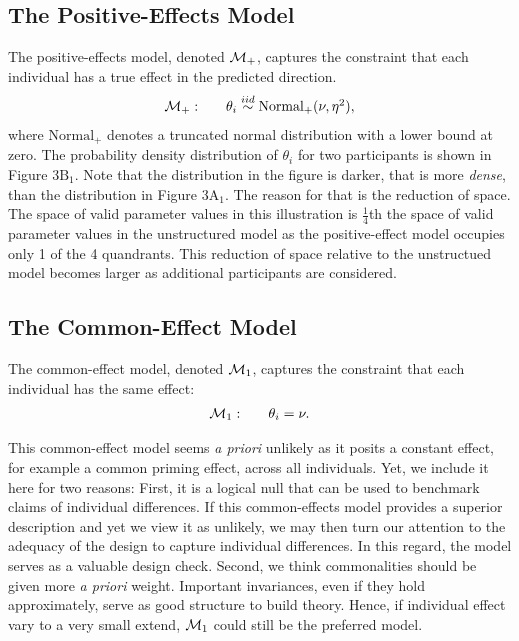 \documentclass[american,man]{apa6}
\begin{document}
\subsection{The Positive-Effects
Model}\label{the-positive-effects-model}

The positive-effects model, denoted \({\cal M}_+\), captures the constraint
that each individual has a true effect in the predicted direction. \[
  \begin{array}{llr}
{\cal M}_+: & & \theta_i \stackrel{iid}{\sim} \mbox{Normal}_+(\nu,\eta^2),\\
  \end{array}
\] where \(\mbox{Normal}_+\) denotes a truncated normal distribution
with a lower bound at zero. The probability density distribution of
\(\theta_i\) for two participants is shown in Figure 3\(\mbox{B}_1\).
Note that the distribution in the figure is darker, that is more
\emph{dense}, than the distribution in Figure 3\(\mbox{A}_1\). The
reason for that is the reduction of space. The space of valid parameter
values in this illustration is \(\frac{1}{4}\)th the space of valid
parameter values in the unstructured model as the positive-effect model
occupies only 1 of the 4 quandrants. This reduction of space relative to
the unstructued model becomes larger as additional participants are
considered.

\subsection{The Common-Effect Model}\label{the-common-effect-model}

The common-effect model, denoted \({\cal M}_1\), captures the constraint
that each individual has the same effect:\\\[
  \begin{array}{llrr}
{\cal M}_1: & & \theta_i = \nu.\\
  \end{array}
\]

This common-effect model seems \emph{a priori} unlikely as it posits a
constant effect, for example a common priming effect, across all
individuals. Yet, we include it here for two reasons: First, it is a
logical null that can be used to benchmark claims of individual
differences. If this common-effects model provides a superior
description and yet we view it as unlikely, we may then turn our
attention to the adequacy of the design to capture individual
differences. In this regard, the model serves as a valuable design
check. Second, we think commonalities should be given more \emph{a
priori} weight. Important invariances, even if they hold approximately,
serve as good structure to build theory. Hence, if individual effect
vary to a very small extend, \({\cal M}_1\) could still be the preferred
model.
\end{document}
